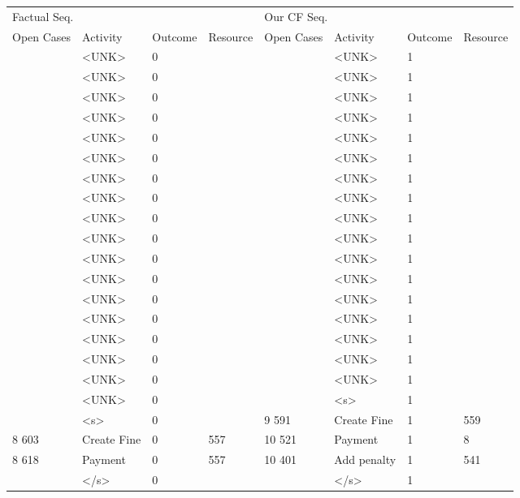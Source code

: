 \begin{tabular}{llllllll}
\toprule
\multicolumn{4}{l}{Factual Seq.} & \multicolumn{4}{l}{Our CF Seq.} \\
Open Cases & Activity & Outcome & Resource & Open Cases & Activity & Outcome & Resource \\
\midrule
 & <UNK> & 0 &  &  & <UNK> & 1 &  \\
 & <UNK> & 0 &  &  & <UNK> & 1 &  \\
 & <UNK> & 0 &  &  & <UNK> & 1 &  \\
 & <UNK> & 0 &  &  & <UNK> & 1 &  \\
 & <UNK> & 0 &  &  & <UNK> & 1 &  \\
 & <UNK> & 0 &  &  & <UNK> & 1 &  \\
 & <UNK> & 0 &  &  & <UNK> & 1 &  \\
 & <UNK> & 0 &  &  & <UNK> & 1 &  \\
 & <UNK> & 0 &  &  & <UNK> & 1 &  \\
 & <UNK> & 0 &  &  & <UNK> & 1 &  \\
 & <UNK> & 0 &  &  & <UNK> & 1 &  \\
 & <UNK> & 0 &  &  & <UNK> & 1 &  \\
 & <UNK> & 0 &  &  & <UNK> & 1 &  \\
 & <UNK> & 0 &  &  & <UNK> & 1 &  \\
 & <UNK> & 0 &  &  & <UNK> & 1 &  \\
 & <UNK> & 0 &  &  & <UNK> & 1 &  \\
 & <UNK> & 0 &  &  & <UNK> & 1 &  \\
 & <UNK> & 0 &  &  & <s> & 1 &  \\
 & <s> & 0 &  & 9 591 & Create Fine & 1 & 559 \\
8 603 & Create Fine & 0 & 557 & 10 521 & Payment & 1 & 8 \\
8 618 & Payment & 0 & 557 & 10 401 & Add penalty & 1 & 541 \\
 & </s> & 0 &  &  & </s> & 1 &  \\
\bottomrule
\end{tabular}
